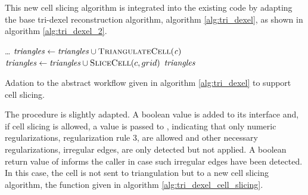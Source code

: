 This new cell slicing algorithm is integrated into the existing code by adapting the base tri-dexel reconstruction algorithm, algorithm \ref{alg:tri_dexel}, as shown in algorithm \ref{alg:tri_dexel_2}.
%
\begin{algorithm}
	\centering
	\begin{algorithmic}[1]
		\hfill\break
			\hspace*{\dimexpr\algorithmicindent*1}\dots
					\State $\var{triangles} \gets \var{triangles} \cup \Call{TriangulateCell}{\var{c}}$
				\Else
					\State $\var{triangles} \gets \var{triangles} \cup \Call{SliceCell}{c, grid}$
				\EndIf
			\EndFor
			\State \Return $\mathit{triangles}$
		\EndFunction
	\end{algorithmic}
	\caption{
		Adation to the abstract workflow given in algorithm \ref{alg:tri_dexel} to support cell slicing.
	}
	\label{alg:tri_dexel_2}
\end{algorithm}
%
The  procedure is slightly adapted.
A boolean value is added to its interface and, if cell slicing is allowed, a value \True is passed to , indicating that only numeric regularizations, \cf regularization rule 3, are allowed and other necessary regularizations, \ie irregular edges, are only detected but not applied.
A boolean return value of  informs the caller in case such irregular edges have been detected.
In this case, the cell is not sent to triangulation but to a new cell slicing algorithm, the  function given in algorithm \ref{alg:tri_dexel_cell_slicing}.
%
